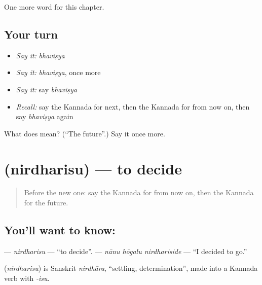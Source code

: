 \begin{grammarlens}[title={What you've built}]
One more word for this chapter.
\end{grammarlens}

\subsection*{Your turn}
\begin{itemize}
\raggedright
  \item \emph{Say it:} \emph{bhaviṣya}
  \item \emph{Say it:} \emph{bhaviṣya}, once more
  \item \emph{Say it:} say \emph{bhaviṣya}
  \item \emph{Recall:} say the Kannada for next, then the Kannada for from now on, then say \emph{bhaviṣya} again
\end{itemize}

\begin{tcolorbox}[breakable,colback=teal!4,colframe=teal!35!black,title={Before you move on}]
What does  mean? (\textquotedblleft{}The future\textquotedblright{}.) Say it once more.
\end{tcolorbox}
\section[\texorpdfstring{\kn{ನಿರ್ಧರಿಸು} (nirdharisu)}{ನಿರ್ಧರಿಸು (nirdharisu)}]{ (nirdharisu) — to decide}

\label{lesson:KA-C156-nirdharisu}



\begin{quote}
Before the new one: say the Kannada for from now on, then the Kannada for the future.
\end{quote}

\subsection*{You'll want to know: }
\textbf{} — \emph{nirdharisu} — \textquotedblleft{}to decide\textquotedblright{}. \textbf{  } — \emph{nānu hōgalu nirdhariside} — \textquotedblleft{}I decided to go.\textquotedblright{}

\begin{cousinweb}
\textbf{} (\emph{nirdharisu}) is Sanskrit \emph{nirdhāra}, \textquotedblleft{}settling, determination\textquotedblright{}, made into a Kannada verb with \emph{-isu}.
\end{cousinweb}

